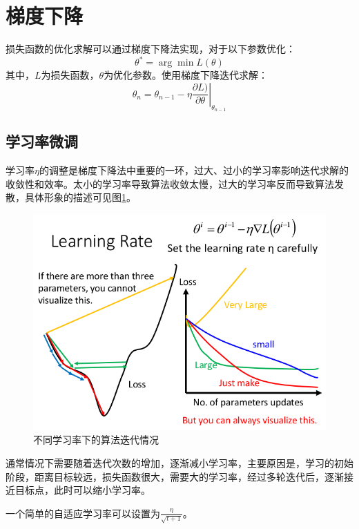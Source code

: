 \section{梯度下降}
损失函数的优化求解可以通过梯度下降法实现，对于以下参数优化：
\begin{equation}
\theta^* = \arg \min L(\theta)
\end{equation}
其中，$L$为损失函数，$\theta$为优化参数。使用梯度下降迭代求解：
\begin{equation}
	\theta_n = \theta_{n-1} - \left. \eta \frac{\partial L)}{\partial \theta}\right|_{\theta_{n-1}}
\end{equation}

\subsection{学习率微调}
学习率$\eta$的调整是梯度下降法中重要的一环，过大、过小的学习率影响迭代求解的收敛性和效率。太小的学习率导致算法收敛太慢，过大的学习率反而导致算法发散，具体形象的描述可见图\ref{fig:learning_rate}。
\begin{figure}
	\centering
	\includegraphics[scale=0.4]{pic/learning_rate}
	\caption{不同学习率下的算法迭代情况}
	\label{fig:learning_rate}
\end{figure}

通常情况下需要随着迭代次数的增加，逐渐减小学习率，主要原因是，学习的初始阶段，距离目标较远，损失函数很大，需要大的学习率，经过多轮迭代后，逐渐接近目标点，此时可以缩小学习率。

一个简单的自适应学习率可以设置为$\frac{\eta}{\sqrt{t+1}}$。

